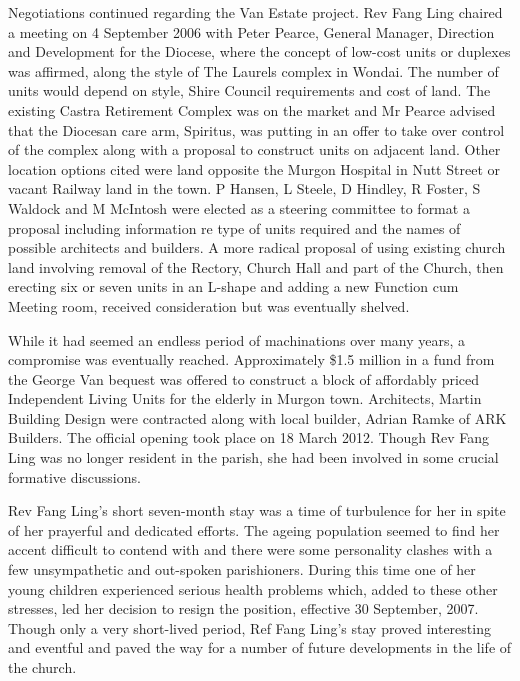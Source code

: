 Negotiations continued regarding the Van Estate project. Rev Fang Ling chaired a meeting on 4 September 2006 with Peter Pearce, General Manager, Direction and Development for the Diocese, where the concept of low-cost units or duplexes was affirmed, along the style of The Laurels complex in Wondai. The number of units would depend on style, Shire Council requirements and cost of land. The existing Castra Retirement Complex was on the market and Mr Pearce advised that the Diocesan care arm, Spiritus, was putting in an offer to take over control of the complex along with a proposal to construct units on adjacent land. Other location options cited were land opposite the Murgon Hospital in Nutt Street or vacant Railway land in the town. P Hansen, L Steele, D Hindley, R Foster, S Waldock and M McIntosh were elected as a steering committee to format a proposal including information re type of units required and the names of possible architects and builders. A more radical proposal of using existing church land involving removal of the Rectory, Church Hall and part of the Church, then erecting six or seven units in an L-shape and adding a new Function cum Meeting room, received consideration but was eventually shelved.



While it had seemed an endless period of machinations over many years, a compromise was eventually reached. Approximately \$1.5 million in a fund from the George Van bequest was offered to construct a block of affordably priced Independent Living Units for the elderly in Murgon town. Architects, Martin Building Design were contracted along with local builder, Adrian Ramke of ARK Builders. The official opening took place on 18 March 2012. Though Rev Fang Ling was no longer resident in the parish, she had been involved in some crucial formative discussions.



Rev Fang Ling's short seven-month stay was a time of turbulence for her in spite of her prayerful and dedicated efforts. The ageing population seemed to find her accent difficult to contend with and there were some personality clashes with a few unsympathetic and out-spoken parishioners. During this time one of her young children experienced serious health problems which, added to these other stresses, led her decision to resign the position, effective 30 September, 2007. Though only a very short-lived period, Ref Fang Ling's stay proved interesting and eventful and paved the way for a number of future developments in the life of the church.



